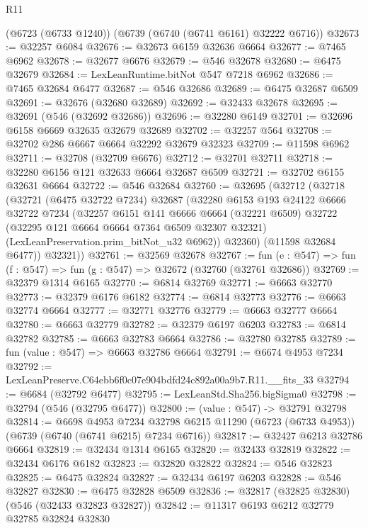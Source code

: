 \begin{lexlean}{R11}
\begin{coremodule}
    (@6723 (@6733 @1240))
    (@6739 (@6740 (@6741 @6161) @32222 @6716))
@32673 := @32257 @6084
@32676 := @32673 @6159 @32636 @6664
@32677 := @7465 @6962
@32678 := @32677 @6676
@32679 := @546 @32678
@32680 := @6475 @32679
@32684 := LexLeanRuntime.bitNot @547 @7218 @6962
@32686 := @7465 @32684 @6477
@32687 := @546 @32686
@32689 := @6475 @32687 @6509
@32691 := @32676 (@32680 @32689)
@32692 := @32433 @32678
@32695 := @32691 (@546 (@32692 @32686))
@32696 := @32280 @6149
@32701 := @32696 @6158 @6669 @32635 @32679 @32689
@32702 := @32257 @564
@32708 := @32702 @286 @6667 @6664 @32292 @32679 @32323
@32709 := @11598 @6962
@32711 := @32708 (@32709 @6676)
@32712 := @32701 @32711
@32718 := @32280 @6156 @121 @32633 @6664 @32687 @6509
@32721 := @32702 @6155 @32631 @6664
@32722 := @546 @32684
@32760 := @32695
    (@32712
      (@32718
        (@32721
          (@6475 @32722 @7234)
          @32687
          (@32280
            @6153
            @193
            @24122
            @6666
            @32722
            @7234
            (@32257
              @6151
              @141
              @6666
              @6664
              (@32221 @6509)
              @32722
              (@32295 @121 @6664 @6664 @7364 @6509 @32307 @32321)
              (LexLeanPreservation.prim_bitNot_u32 @6962))
            @32360)
          (@11598 @32684 @6477))
        @32321))
@32761 := @32569 @32678
@32767 := fun (e : @547) => fun (f : @547) => fun (g : @547) => @32672 (@32760 (@32761 @32686))
@32769 := @32379 @1314 @6165
@32770 := @6814 @32769
@32771 := @6663 @32770
@32773 := @32379 @6176 @6182
@32774 := @6814 @32773
@32776 := @6663 @32774 @6664
@32777 := @32771 @32776
@32779 := @6663 @32777 @6664
@32780 := @6663 @32779
@32782 := @32379 @6197 @6203
@32783 := @6814 @32782
@32785 := @6663 @32783 @6664
@32786 := @32780 @32785
@32789 := fun (value : @547) => @6663 @32786 @6664
@32791 := @6674 @4953 @7234
@32792 := LexLeanPreserve.C64ebb6f0c07e904bdfd24c892a00a9b7.R11.__fits_33
@32794 := @6684 (@32792 @6477)
@32795 := LexLeanStd.Sha256.bigSigma0
@32798 := @32794 (@546 (@32795 @6477))
@32800 := (value : @547) -> @32791 @32798
@32814 := @6698
    @4953
    @7234
    @32798
    @6215
    @11290
    (@6723 (@6733 @4953))
    (@6739 (@6740 (@6741 @6215) @7234 @6716))
@32817 := @32427 @6213 @32786 @6664
@32819 := @32434 @1314 @6165
@32820 := @32433 @32819
@32822 := @32434 @6176 @6182
@32823 := @32820 @32822
@32824 := @546 @32823
@32825 := @6475 @32824
@32827 := @32434 @6197 @6203
@32828 := @546 @32827
@32830 := @6475 @32828 @6509
@32836 := @32817 (@32825 @32830) (@546 (@32433 @32823 @32827))
@32842 := @11317 @6193 @6212 @32779 @32785 @32824 @32830

\end{coremodule}
\end{lexlean}
